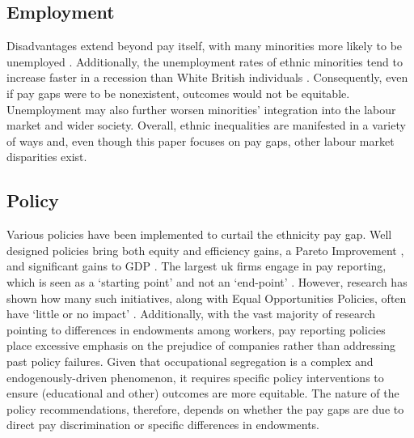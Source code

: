 \documentclass[class=article, crop=false]{standalone}
\begin{document}
\subsection{Employment}
\label{sec:Employment}
Disadvantages extend beyond pay itself, with many minorities more likely to be unemployed \citep{Heath}. Additionally, the unemployment rates of ethnic minorities tend to increase faster in a recession than White British individuals \citep{Jones}. Consequently, even if pay gaps were to be nonexistent, outcomes would not be equitable. Unemployment may also further worsen minorities' integration into the labour market and wider society. Overall, ethnic inequalities are manifested in a variety of ways and, even though this paper focuses on pay gaps, other labour market disparities exist. %

\subsection{Policy}
\label{sec:Policy} %
Various policies have been implemented to curtail the ethnicity pay gap. Well designed policies bring both equity and efficiency gains, a Pareto Improvement \citep{LundbergB}, and significant gains to GDP \citep{GOVg}. The largest \acrshort{uk} firms engage in pay reporting, which is seen as a \enquote*{starting point} and not an \enquote*{end-point} \citep{BoE}. However, research has shown how many such initiatives, along with Equal Opportunities Policies, often have \enquote*{little or no impact} \cite[p.~113]{Noon}. Additionally, with the vast majority of research pointing to differences in endowments among workers, pay reporting policies place excessive emphasis on the prejudice of companies rather than addressing past policy failures. Given that occupational segregation is a complex and endogenously-driven phenomenon, it requires specific policy interventions to ensure (educational and other) outcomes are more equitable. The nature of the policy recommendations, therefore, depends on whether the pay gaps are due to direct pay discrimination or specific differences in endowments.

\ifstandalone

\fi
\end{document}
